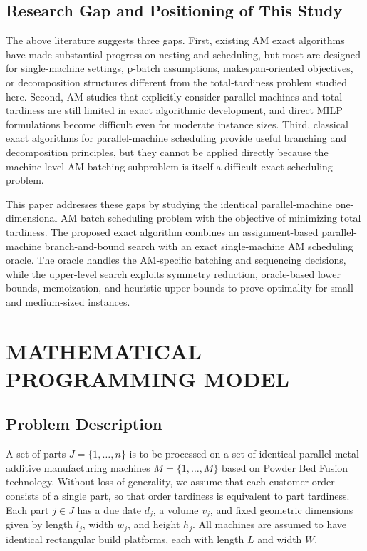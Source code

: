 \documentclass[review,3p,times,authoryear]{elsarticle}
\begin{document}
\subsection{Research Gap and Positioning of This Study}

The above literature suggests three gaps. First, existing AM exact algorithms
have made substantial progress on nesting and scheduling, but most are designed
for single-machine settings, p-batch assumptions, makespan-oriented objectives,
or decomposition structures different from the total-tardiness problem studied
here. Second, AM studies that explicitly consider parallel machines and total
tardiness are still limited in exact algorithmic development, and direct MILP
formulations become difficult even for moderate instance sizes. Third,
classical exact algorithms for parallel-machine scheduling provide useful
branching and decomposition principles, but they cannot be applied directly
because the machine-level AM batching subproblem is itself a difficult exact
scheduling problem.

This paper addresses these gaps by studying the identical parallel-machine
one-dimensional AM batch scheduling problem with the objective of minimizing
total tardiness. The proposed exact algorithm combines an assignment-based
parallel-machine branch-and-bound search with an exact single-machine AM
scheduling oracle. The oracle handles the AM-specific batching and sequencing
decisions, while the upper-level search exploits symmetry reduction,
oracle-based lower bounds, memoization, and heuristic upper bounds to prove
optimality for small and medium-sized instances.

\section{MATHEMATICAL PROGRAMMING MODEL}

\subsection{Problem Description}
A set of parts $J=\{1,\dots,n\}$ is to be processed on a set of identical
parallel metal additive manufacturing machines $M=\{1,\dots,\bar M\}$
based on Powder Bed Fusion technology. Without loss of generality, we assume
that each customer order consists of a single part, so that order tardiness
is equivalent to part tardiness. Each part $j \in J$ has a due date $d_j$, a
volume $v_j$, and fixed geometric dimensions given by length $l_j$, width
$w_j$, and height $h_j$. All machines are assumed to have identical
rectangular build platforms, each with length $L$ and width $W$.
\end{document}

